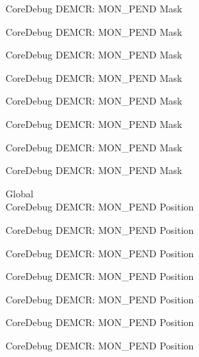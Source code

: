 \begin{DoxyRefList}
\label{deprecated__deprecated000503}%
%
Core\+Debug DEMCR\+: MON\+\_\+\+PEND Mask 

\label{deprecated__deprecated000605}%
%
Core\+Debug DEMCR\+: MON\+\_\+\+PEND Mask 

\label{deprecated__deprecated000730}%
%
Core\+Debug DEMCR\+: MON\+\_\+\+PEND Mask 

\label{deprecated__deprecated000874}%
%
Core\+Debug DEMCR\+: MON\+\_\+\+PEND Mask 

\label{deprecated__deprecated001016}%
%
Core\+Debug DEMCR\+: MON\+\_\+\+PEND Mask 

\label{deprecated__deprecated001092}%
%
Core\+Debug DEMCR\+: MON\+\_\+\+PEND Mask 

\label{deprecated__deprecated001181}%
%
Core\+Debug DEMCR\+: MON\+\_\+\+PEND Mask 

\label{deprecated__deprecated001283}%
%
Core\+Debug DEMCR\+: MON\+\_\+\+PEND Mask  
\item[Global \doxylink{group___c_m_s_i_s___core_debug_ga1e2f706a59e0d8131279af1c7e152f8d}{Core\+Debug\+\_\+\+DEMCR\+\_\+\+MON\+\_\+\+PEND\+\_\+\+Pos} ]\hfill \\
\label{deprecated__deprecated000051}%
%
Core\+Debug DEMCR\+: MON\+\_\+\+PEND Position 

\label{deprecated__deprecated000195}%
%
Core\+Debug DEMCR\+: MON\+\_\+\+PEND Position 

\label{deprecated__deprecated000337}%
%
Core\+Debug DEMCR\+: MON\+\_\+\+PEND Position 

\label{deprecated__deprecated000413}%
%
Core\+Debug DEMCR\+: MON\+\_\+\+PEND Position 

\label{deprecated__deprecated000502}%
%
Core\+Debug DEMCR\+: MON\+\_\+\+PEND Position 

\label{deprecated__deprecated000604}%
%
Core\+Debug DEMCR\+: MON\+\_\+\+PEND Position 

\label{deprecated__deprecated000729}%
%
Core\+Debug DEMCR\+: MON\+\_\+\+PEND Position 


\end{DoxyRefList}
